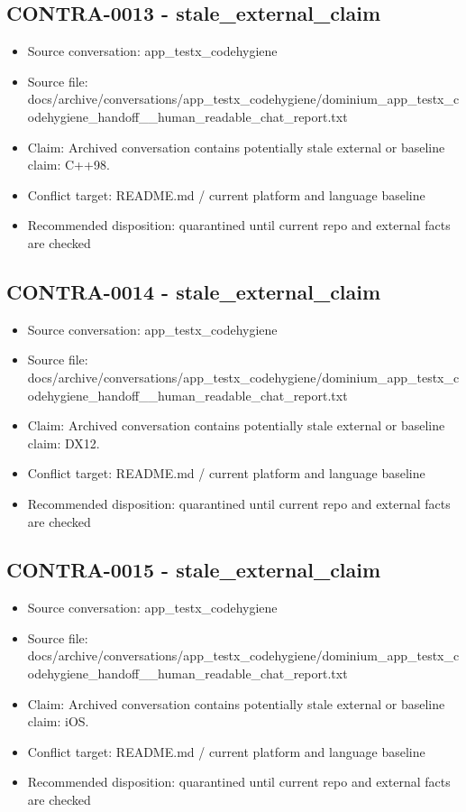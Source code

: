 \documentclass[11pt,a4paper]{report}
\begin{document}
\subsection{CONTRA-0013 - stale\_external\_claim}

\begin{itemize}
\item Source conversation: app\_testx\_codehygiene
\item Source file: docs/archive/conversations/app\_testx\_codehygiene/dominium\_app\_testx\_codehygiene\_handoff\_\_human\_readable\_chat\_report.txt
\item Claim: Archived conversation contains potentially stale external or baseline claim: C++98.
\item Conflict target: README.md / current platform and language baseline
\item Recommended disposition: quarantined until current repo and external facts are checked
\end{itemize}

\subsection{CONTRA-0014 - stale\_external\_claim}

\begin{itemize}
\item Source conversation: app\_testx\_codehygiene
\item Source file: docs/archive/conversations/app\_testx\_codehygiene/dominium\_app\_testx\_codehygiene\_handoff\_\_human\_readable\_chat\_report.txt
\item Claim: Archived conversation contains potentially stale external or baseline claim: DX12.
\item Conflict target: README.md / current platform and language baseline
\item Recommended disposition: quarantined until current repo and external facts are checked
\end{itemize}

\subsection{CONTRA-0015 - stale\_external\_claim}

\begin{itemize}
\item Source conversation: app\_testx\_codehygiene
\item Source file: docs/archive/conversations/app\_testx\_codehygiene/dominium\_app\_testx\_codehygiene\_handoff\_\_human\_readable\_chat\_report.txt
\item Claim: Archived conversation contains potentially stale external or baseline claim: iOS.
\item Conflict target: README.md / current platform and language baseline
\item Recommended disposition: quarantined until current repo and external facts are checked
\end{itemize}
\end{document}

